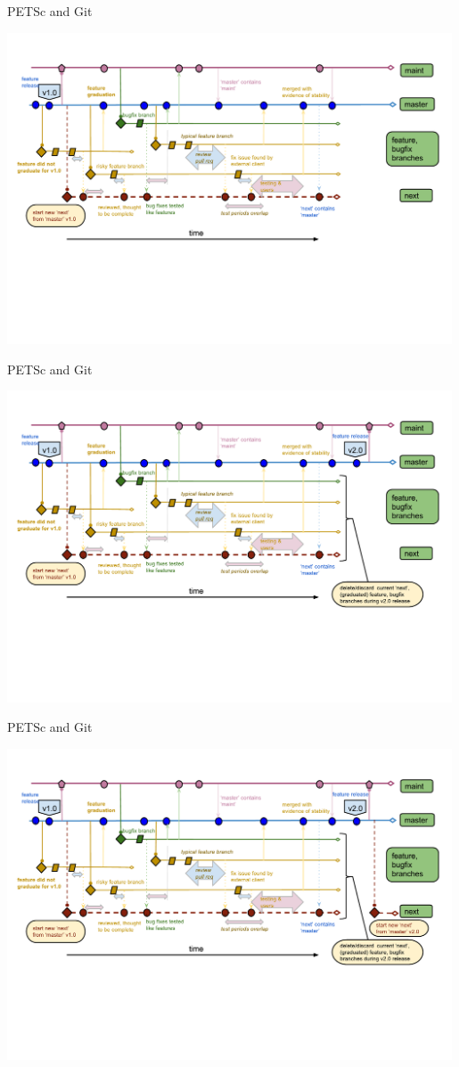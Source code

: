 \begin{frame}{PETSc and Git}
  \begin{center}
    \includegraphics[width=0.99\textwidth]{figures/gitworkflows-85}
  \end{center}
\end{frame}

\begin{frame}{PETSc and Git}
  \begin{center}
    \includegraphics[width=0.99\textwidth]{figures/gitworkflows-90}
  \end{center}
\end{frame}

\begin{frame}{PETSc and Git}
  \begin{center}
    \includegraphics[width=0.99\textwidth]{figures/gitworkflows-95}
  \end{center}
\end{frame}

